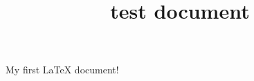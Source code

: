 \documentclass[tutorial]{cmpreport}
\title{test document}
\begin{document}
	My first \LaTeX{} document!
\end{document}
